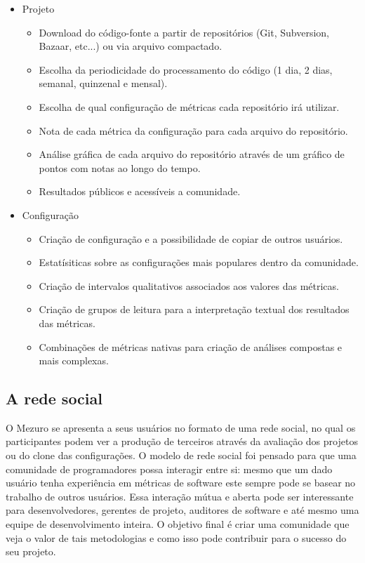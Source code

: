 \documentclass[12pt]{article}
\begin{document}
  \begin{itemize}
    \item Projeto
      \begin{itemize}
      \item Download do código-fonte a partir de repositórios (Git, Subversion, Bazaar, etc...) ou via arquivo compactado.
          \item Escolha da periodicidade do processamento do código (1 dia, 2 dias, semanal, quinzenal e mensal).
          \item Escolha de qual configuração de métricas cada repositório irá utilizar.
          \item Nota de cada métrica da configuração para cada arquivo do repositório.
          \item Análise gráfica de cada arquivo do repositório através de um gráfico de pontos com notas ao longo do tempo.
          \item Resultados públicos e acessíveis a comunidade.
      \end{itemize}
      \item Configuração
      \begin{itemize}
      \item Criação de configuração e a possibilidade de copiar de outros usuários.
          \item Estatísiticas sobre as configurações mais populares dentro da comunidade.
          \item Criação de intervalos qualitativos associados aos valores das métricas.
          \item Criação de grupos de leitura para a interpretação textual dos resultados das métricas.
          \item Combinações de métricas nativas para criação de análises compostas e mais complexas.
      \end{itemize}
  \end{itemize}

  \subsection{A rede social}\label{sec:user-potencial}
  O Mezuro se apresenta a seus usuários no formato de uma rede social, no qual os participantes podem ver a produção de terceiros através da avaliação dos projetos ou do clone das configurações. O modelo de rede social foi pensado para que uma comunidade de programadores possa interagir entre si: mesmo que um dado usuário tenha experiência em métricas de software este sempre pode se basear no trabalho de outros usuários. Essa interação mútua e aberta pode ser interessante para desenvolvedores, gerentes de projeto, auditores de software e até mesmo uma equipe de desenvolvimento inteira. O objetivo final é criar uma comunidade que veja o valor de tais metodologias e como isso pode contribuir para o sucesso do seu projeto.
\end{document}
